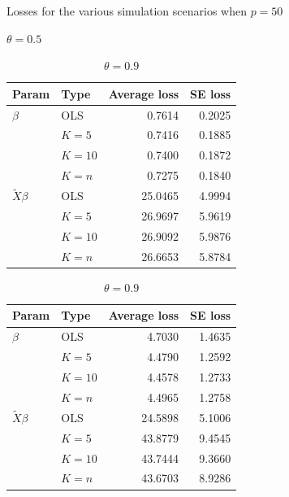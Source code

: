 \documentclass{article}\usepackage[]{graphicx}\usepackage[]{color}
\begin{document}
\begin{table}[!htb]
    \caption{Losses for the various simulation scenarios when $p=50$}
    \label{tab:p50}
    \begin{subtable}{.5\linewidth}
      \caption{$\theta=0.5$}
      \centering
      \begin{tabular}{|llrr|}
       \hline
     Param & Type & Average loss & SE loss \\ 
      \hline
  $\beta$ & OLS & 0.7614 & 0.2025 \\ 
  & $K=5$ & 0.7416 & 0.1885 \\ 
  & $K=10$ & 0.7400 & 0.1872 \\ 
  & $K=n$ & 0.7275 & 0.1840 \\ 
  \hline
  $\tilde{X}\beta$ & OLS & 25.0465 & 4.9994 \\ 
  & $K=5$ & 26.9697 & 5.9619 \\ 
  & $K=10$ & 26.9092 & 5.9876 \\ 
  & $K=n$ & 26.6653 & 5.8784 \\ 
    \hline
  \end{tabular}
  \end{subtable}%
  \begin{subtable}{.5\linewidth}
      \centering
        \caption{$\theta=0.9$}
        \begin{tabular}{|llrr|}
       \hline
     Param & Type & Average loss & SE loss \\ 
      \hline
  $\beta$ & OLS & 4.7030 & 1.4635 \\ 
  & $K=5$ & 4.4790 & 1.2592 \\ 
  & $K=10$ & 4.4578 & 1.2733 \\ 
  & $K=n$ & 4.4965 & 1.2758 \\ 
  \hline
  $\tilde{X}\beta$ & OLS & 24.5898 & 5.1006 \\ 
  & $K=5$ & 43.8779 & 9.4545 \\ 
  & $K=10$ & 43.7444 & 9.3660 \\ 
  & $K=n$ & 43.6703 & 8.9286 \\ 
    \hline
  \end{tabular}
    \end{subtable} 
\end{table}
\end{document}
